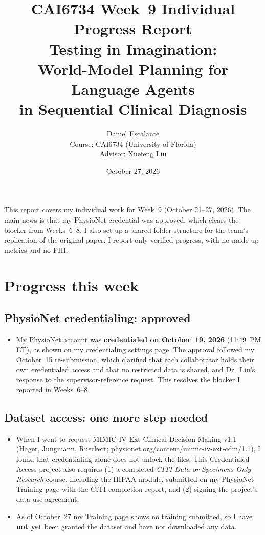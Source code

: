 \documentclass[11pt,letterpaper]{article}
\title{\textbf{CAI6734 Week~9 Individual Progress Report}\\[0.35em]
\large Testing in Imagination:\\
World-Model Planning for Language Agents\\
in Sequential Clinical Diagnosis}
\author{Daniel Escalante\\[0.4em]
\small Course: CAI6734 (University of Florida)\\
Advisor: Xuefeng Liu}
\date{October 27, 2026}
\begin{document}
\maketitle
\thispagestyle{empty}

\noindent
This report covers my individual work for Week~9 (October 21--27, 2026). The main news is that my PhysioNet credential was approved, which clears the blocker from Weeks~6--8. I also set up a shared folder structure for the team's replication of the original paper. I report only verified progress, with no made-up metrics and no PHI.

\section{Progress this week}

\subsection{PhysioNet credentialing: approved}
\begin{itemize}
  \item My PhysioNet account was \textbf{credentialed on October~19, 2026} (11:49~PM ET), as shown on my credentialing settings page. The approval followed my October~15 re-submission, which clarified that each collaborator holds their own credentialed access and that no restricted data is shared, and Dr.~Liu's response to the supervisor-reference request. This resolves the blocker I reported in Weeks~6--8.
\end{itemize}

\subsection{Dataset access: one more step needed}
\begin{itemize}
  \item When I went to request MIMIC-IV-Ext Clinical Decision Making v1.1 (Hager, Jungmann, Rueckert; \href{https://physionet.org/content/mimic-iv-ext-cdm/1.1/}{physionet.org/content/mimic-iv-ext-cdm/1.1}), I found that credentialing alone does not unlock the files. This Credentialed Access project also requires (1) a completed \emph{CITI Data or Specimens Only Research} course, including the HIPAA module, submitted on my PhysioNet Training page with the CITI completion report, and (2) signing the project's data use agreement.
  \item As of October~27 my Training page shows no training submitted, so I have \textbf{not yet} been granted the dataset and have not downloaded any data.
\end{itemize}
\end{document}
